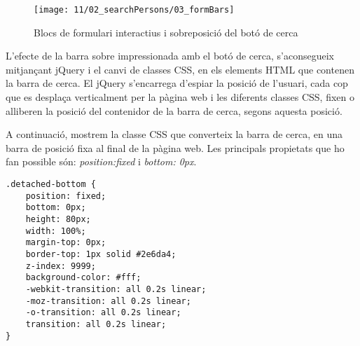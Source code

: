 \begin{figure}[h]
    \texttt{[image: 11/02\_searchPersons/03\_formBars]}
    \centering
    \caption{Blocs de formulari interactius i sobreposició del botó de cerca}\label{fig:interactiveFormBloc}
\end{figure}

L'efecte de la barra sobre impressionada amb el botó de cerca, s'aconsegueix mitjançant jQuery i el canvi de classes CSS, en els elements HTML que contenen la barra de cerca. El jQuery s'encarrega d'espiar la posició de l'usuari, cada cop que es desplaça verticalment per la pàgina web i les diferents classes CSS, fixen o alliberen la posició del contenidor de la barra de cerca, segons aquesta posició.

A continuació, mostrem la classe CSS que converteix la barra de cerca, en una barra de posició fixa al final de la pàgina web. Les principals propietats que ho fan possible són: \emph{position:fixed} i \emph{bottom: 0px}.

\begin{lstlisting}[style=rawOwn,caption={Classe CSS per sobre impressionar el botó de cerca}]
.detached-bottom {
    position: fixed;
    bottom: 0px;
    height: 80px;
    width: 100%;
    margin-top: 0px;
    border-top: 1px solid #2e6da4;
    z-index: 9999;
    background-color: #fff;
    -webkit-transition: all 0.2s linear;
    -moz-transition: all 0.2s linear;
    -o-transition: all 0.2s linear;
    transition: all 0.2s linear;
}
\end{lstlisting}
